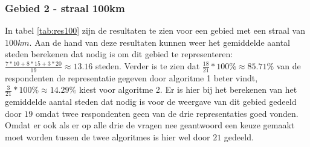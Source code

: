 \documentclass[twoside,openright]{uva-bachelor-thesis}
\begin{document}
			\subsubsection{Gebied 2 - straal 100km}
				In tabel \ref{tab:res100} zijn de resultaten te zien voor een gebied met een straal van $100km$. Aan de hand van deze resultaten kunnen weer het gemiddelde aantal steden berekenen dat nodig is om dit gebied te representeren: $\frac{7 * 10 + 8 * 15 + 3 * 20}{19} \approx 13.16$ steden. Verder is te zien dat $\frac{18}{21}  * 100\%\approx 85.71\%$ van de respondenten de representatie gegeven door algoritme 1 beter vindt, $\frac{3}{21} * 100\% \approx 14.29\%$ kiest voor algoritme 2. Er is hier bij het berekenen van het gemiddelde aantal steden dat nodig is voor de weergave van dit gebied gedeeld door $19$ omdat twee respondenten geen van de drie representaties goed vonden. Omdat er ook als er op alle drie de vragen nee geantwoord een keuze gemaakt moet worden tussen de twee algoritmes is hier wel door $21$ gedeeld.
\end{document}
